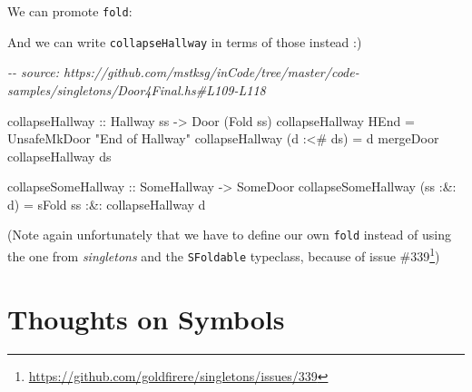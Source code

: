 \documentclass[]{article}
\newenvironment{Shaded}{}{}
\newcommand{\CommentTok}[1]{\textcolor[rgb]{0.38,0.63,0.69}{\textit{#1}}}
\newcommand{\DataTypeTok}[1]{\textcolor[rgb]{0.56,0.13,0.00}{#1}}
\newcommand{\NormalTok}[1]{#1}
\newcommand{\OperatorTok}[1]{\textcolor[rgb]{0.40,0.40,0.40}{#1}}
\newcommand{\OtherTok}[1]{\textcolor[rgb]{0.00,0.44,0.13}{#1}}
\newcommand{\StringTok}[1]{\textcolor[rgb]{0.25,0.44,0.63}{#1}}
\renewcommand{\href}[2]{#2\footnote{\url{#1}}}
\begin{document}
We can promote \texttt{fold}:

\begin{Shaded}
\end{Shaded}

And we can write \texttt{collapseHallway} in terms of those instead :)

\begin{Shaded}
\begin{Highlighting}[]
\CommentTok{{-}{-} source: https://github.com/mstksg/inCode/tree/master/code{-}samples/singletons/Door4Final.hs\#L109{-}L118}

\NormalTok{collapseHallway\textquotesingle{}}
\OtherTok{    ::} \DataTypeTok{Hallway}\NormalTok{ ss}
    \OtherTok{{-}\textgreater{}} \DataTypeTok{Door}\NormalTok{ (}\DataTypeTok{Fold}\NormalTok{ ss)}
\NormalTok{collapseHallway\textquotesingle{} }\DataTypeTok{HEnd}       \OtherTok{=} \DataTypeTok{UnsafeMkDoor} \StringTok{"End of Hallway"}
\NormalTok{collapseHallway\textquotesingle{} (d }\OperatorTok{:\textless{}\#}\NormalTok{ ds) }\OtherTok{=}\NormalTok{ d }\OtherTok{\textasciigrave{}mergeDoor\textasciigrave{}}\NormalTok{ collapseHallway\textquotesingle{} ds}

\OtherTok{collapseSomeHallway\textquotesingle{} ::} \DataTypeTok{SomeHallway} \OtherTok{{-}\textgreater{}} \DataTypeTok{SomeDoor}
\NormalTok{collapseSomeHallway\textquotesingle{} (ss }\OperatorTok{:\&:}\NormalTok{ d) }\OtherTok{=}
\NormalTok{        sFold ss}
    \OperatorTok{:\&:}\NormalTok{ collapseHallway\textquotesingle{} d}
\end{Highlighting}
\end{Shaded}

(Note again unfortunately that we have to define our own \texttt{fold} instead
of using the one from \emph{singletons} and the \texttt{SFoldable} typeclass,
because of \href{https://github.com/goldfirere/singletons/issues/339}{issue
\#339})

\section{Thoughts on Symbols}\label{thoughts-on-symbols}
\end{document}
